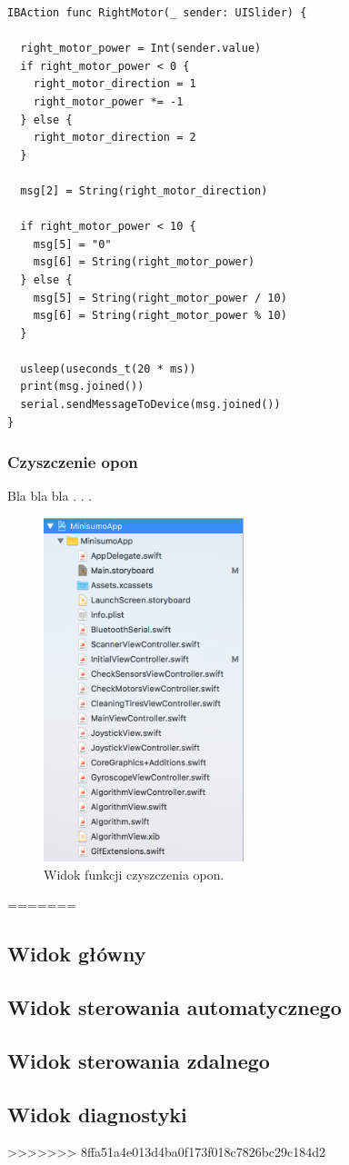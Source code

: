 \begin{minipage}{\textwidth}
	\begin{lstlisting}[label=motorscode,caption=Nasłuchiwanie zmiany położenia suwaka.]
IBAction func RightMotor(_ sender: UISlider) {
  
  right_motor_power = Int(sender.value)
  if right_motor_power < 0 {
    right_motor_direction = 1
    right_motor_power *= -1
  } else {
    right_motor_direction = 2
  }
    
  msg[2] = String(right_motor_direction)
    
  if right_motor_power < 10 {
    msg[5] = "0"
    msg[6] = String(right_motor_power)
  } else {
    msg[5] = String(right_motor_power / 10)
    msg[6] = String(right_motor_power % 10)
  }
    
  usleep(useconds_t(20 * ms))
  print(msg.joined())
  serial.sendMessageToDevice(msg.joined())
}
	\end{lstlisting}
\end{minipage}




\subsubsection{Czyszczenie opon}
Bla bla bla . . .

\begin{figure}[H]
	\centering
		\includegraphics[width=0.75\linewidth, height=10cm, keepaspectratio]{pic05/structure.png}
	\caption{Widok funkcji czyszczenia opon.}
	\label{fig:tires}	
\end{figure}
=======
\subsection{Widok główny}

\subsection{Widok sterowania automatycznego}
\subsection{Widok sterowania zdalnego}
\subsection{Widok diagnostyki}
>>>>>>> 8ffa51a4e013d4ba0f173f018c7826bc29c184d2
